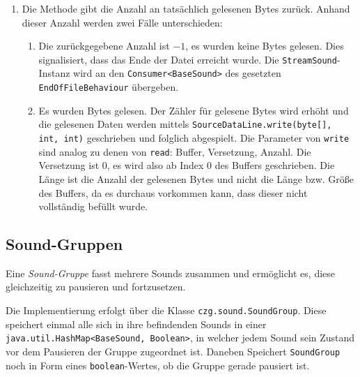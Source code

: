 \begin{sloppypar}
\begin{enumerate}
	      befüllen. Dafür wird dessen \texttt{read(byte[], int, int)}-Methode
	      verwendet. Dabei ist der erste Parameter der Buffer. Der zweite heißt
	      \textit{Offset}, ist also die Versetzung, ab der gelesen werden soll.
	      Diese ist immer $0$. Der dritte Parameter gibt an, wie viele Bytes
	      höchstens gelesen werden sollen. Er ist immer die Länge bzw. Größe
	      des Buffers.
	\item Die Methode gibt die Anzahl an tatsächlich gelesenen Bytes zurück.
	      Anhand dieser Anzahl werden zwei Fälle unterschieden:
	      \begin{enumerate}
	      	\item Die zurückgegebene Anzahl ist $-1$, es wurden keine Bytes gelesen.
	      	      Dies signalisiert, dass das Ende der Datei erreicht wurde. Die
	      	      \texttt{StreamSound}-Instanz wird an den \texttt{Consumer<BaseSound>}
	      	      des gesetzten \texttt{EndOfFileBehaviour} übergeben.
	      	\item Es wurden Bytes gelesen. Der Zähler für gelesene Bytes wird
	      	      erhöht und die gelesenen Daten werden mittels \texttt{SourceDataLine.write(byte[], int, int)}
	      	      geschrieben und folglich abgespielt. Die Parameter von
	      	      \texttt{write} sind analog zu denen von \texttt{read}:
	      	      Buffer, Versetzung, Anzahl. Die Versetzung ist $0$, es
	      	      wird also ab Index $0$ des Buffers geschrieben. Die Länge
	      	      ist die Anzahl der gelesenen Bytes und nicht die Länge
	      	      bzw. Größe des Buffers, da es durchaus vorkommen kann, dass
	      	      dieser nicht vollständig befüllt wurde.
	      \end{enumerate}
\end{enumerate}


\subsection{Sound-Gruppen} \label{programm:engine:sound:gruppe}

Eine \textit{Sound-Gruppe} fasst mehrere Sounds zusammen und
ermöglicht es, diese gleichzeitig zu pausieren und fortzusetzen.

Die Implementierung erfolgt über die Klasse \texttt{czg.sound.SoundGroup}.
Diese speichert einmal alle sich in ihre befindenden Sounds
in einer \texttt{java.util.HashMap<BaseSound, Boolean>}, in welcher
jedem Sound sein Zustand vor dem Pausieren der Gruppe zugeordnet ist.
Daneben Speichert \texttt{SoundGroup} noch in Form eines \texttt{boolean}-Wertes,
ob die Gruppe gerade pausiert ist.


\end{sloppypar}
